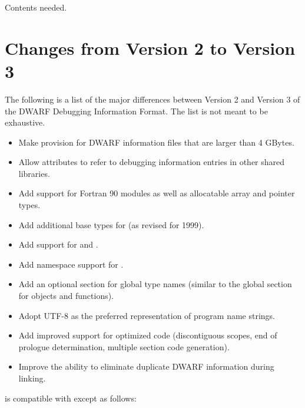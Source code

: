 Contents needed.
\section{Changes from Version 2 to Version 3}
The following is a list of the major differences between
Version 2 and Version 3 of the DWARF Debugging Information
Format. The list is not meant to be exhaustive.

\begin{itemize}
\item
Make provision for DWARF information files that are larger
than 4 GBytes.

\item
Allow attributes to refer to debugging information entries
in other shared libraries.

\item
Add support for Fortran 90 modules as well as allocatable
array and pointer types.

\item
Add additional base types for  (as revised for 1999).

\item
Add support for  and .

\item
Add namespace support for .

\item
Add an optional section for global type names (similar to
the global section for objects and functions).

\item
Adopt UTF-8 as the preferred representation of program name strings.
\item
Add improved support for optimized code (discontiguous
scopes, end of prologue determination, multiple section
code generation).  

\item Improve the ability to eliminate
duplicate DWARF information during linking.  

\end{itemize}

is compatible with 
 except as follows:

